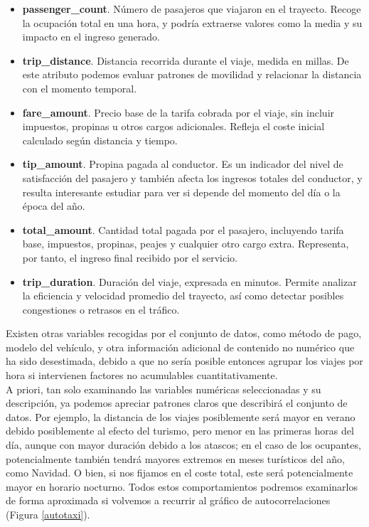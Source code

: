 \begin{itemize}
	\item \textbf{passenger\_count}. Número de pasajeros que viajaron en el trayecto. Recoge la ocupación total en una hora, y podría extraerse valores como la media y su impacto en el ingreso generado.
	
	\item \textbf{trip\_distance}. Distancia recorrida durante el viaje, medida en millas. De este atributo podemos evaluar patrones de movilidad y relacionar la distancia con el momento temporal.
	
	\item \textbf{fare\_amount}. Precio base de la tarifa cobrada por el viaje, sin incluir impuestos, propinas u otros cargos adicionales. Refleja el coste inicial calculado según distancia y tiempo.
	
	\item \textbf{tip\_amount}. Propina pagada al conductor. Es un indicador del nivel de satisfacción del pasajero y también afecta los ingresos totales del conductor, y resulta interesante estudiar para ver si depende del momento del día o la época del año.
	
	\item \textbf{total\_amount}. Cantidad total pagada por el pasajero, incluyendo tarifa base, impuestos, propinas, peajes y cualquier otro cargo extra. Representa, por tanto, el ingreso final recibido por el servicio.
	
	\item \textbf{trip\_duration}. Duración del viaje, expresada en minutos. Permite analizar la eficiencia y velocidad promedio del trayecto, así como detectar posibles congestiones o retrasos en el tráfico.
\end{itemize}

Existen otras variables recogidas por el conjunto de datos, como método de pago, modelo del vehículo, y otra información adicional de contenido no numérico que ha sido desestimada, debido a que no sería posible entonces agrupar los viajes por hora si intervienen factores no acumulables cuantitativamente.\\

A priori, tan solo examinando las variables numéricas seleccionadas y su descripción, ya podemos apreciar patrones claros que describirá el conjunto de datos. Por ejemplo, la distancia de los viajes posiblemente será mayor en verano debido posiblemente al efecto del turismo, pero menor en las primeras horas del día, aunque con mayor duración debido a los atascos; en el caso de los ocupantes, potencialmente también tendrá mayores extremos en meses turísticos del año, como Navidad. O bien, si nos fijamos en el coste total, este será potencialmente mayor en horario nocturno. Todos estos comportamientos podremos examinarlos de forma aproximada si volvemos a recurrir al gráfico de autocorrelaciones (Figura  \ref{autotaxi}).\\
	
